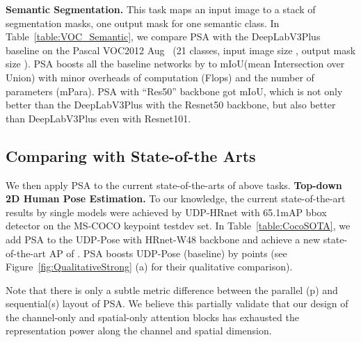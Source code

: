 \documentclass[10pt,twocolumn,letterpaper]{article}
\begin{document}
\textbf{Semantic Segmentation.}  This task maps an input image to a stack of segmentation masks, one output mask for one semantic class. In Table~\ref{table:VOC_Semantic}, we compare PSA with the DeepLabV3Plus~\cite{Chen17} baseline on the Pascal VOC2012 Aug{~\cite{Everingham15}} (21 classes, input image size , output mask size ). PSA boosts all the baseline networks by  to mIoU(mean Intersection over Union) with minor overheads of computation (Flops) and the number of parameters (mPara).  PSA with ``Res50'' backbone got  mIoU, which is not only  better than the DeepLabV3Plus with the Resnet50 backbone, but also better than DeepLabV3Plus even with Resnet101. 


\subsection{Comparing with State-of-the Arts}
We then apply PSA to the current state-of-the-arts of above tasks.
\textbf{Top-down 2D Human Pose Estimation.} To our knowledge, the current state-of-the-art results by single models were achieved by UDP-HRnet with 65.1mAP bbox detector on the MS-COCO keypoint testdev set. In Table~\ref{table:CocoSOTA}, we add PSA to the UDP-Pose with HRnet-W48 backbone and achieve a new state-of-the-art AP of . PSA boosts UDP-Pose (baseline) by  points (see Figure~\ref{fig:QualitativeStrong} (a) for their qualitative comparison). 

Note that there is only a subtle metric difference between the parallel (p) and sequential(s) layout of PSA. We believe this partially validate that our design of the channel-only and spatial-only attention blocks has exhausted the representation power along the channel and spatial dimension. 
\end{document}
